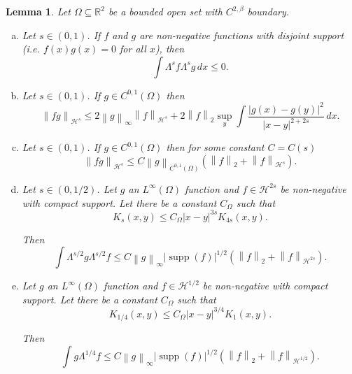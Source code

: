 \documentclass[11pt]{amsart}
\newtheorem{lemma}[theorem]{Lemma}
\theoremstyle{remark}
\theoremstyle{definition}
\newcommand{\R}{\mathbb{R}}
\newcommand{\norm}[1]{\left\lVert#1\right\rVert}
\newcommand{\paren}[1]{\left( #1 \right)}
\DeclareMathOperator{\supp}{supp}
\newcommand{\HD}{\mathcal{H}}
\newcommand{\Comega}{C_\Omega}
\begin{document}
\begin{lemma} \label{thm:Lambda stuff}
Let $\Omega \subseteq \R^2$ be a bounded open set with $C^{2,\beta}$ boundary.  

\begin{enumerate}[(a)]
\item \label{thm:disjoint} Let $s \in (0,1)$.  If $f$ and $g$ are non-negative functions with disjoint support (i.e. $f(x)g(x) = 0$ for all $x$), then 
\[ \int \Lambda^s f \Lambda^s g \,dx \leq 0. \]

\item \label{thm:product rule} Let $s \in (0,1)$.  If $g \in C^{0,1}(\Omega)$ then
\[ \norm{fg}_{\HD^s} \leq 2 \norm{g}_\infty \norm{f}_{\HD^s} + 2 \norm{f}_2 \sup_y \int \frac{|g(x)-g(y)|^2}{|x-y|^{2+2s}} \,dx. \]

\item \label{thm:extra product rule} Let $s \in (0,1)$.  If $g \in C^{0,1}(\Omega)$ then for some constant $C=C(s)$
\[  \norm{fg}_{\HD^s} \leq C \norm{g}_{C^{0,1}(\Omega)} \paren{\norm{f}_2 + \norm{f}_{\HD^s}}. \]

\item \label{thm:L1 of Lambda bounded} Let $s\in(0,1/2)$.  Let $g$ an $L^\infty(\Omega)$ function and $f \in \HD^{2s}$ be non-negative with compact support.  Let there be a constant $\Comega$ such that
\begin{equation} \label{K bounded between orders} K_s(x,y) \leq \Comega |x-y|^{3s} K_{4s}(x,y). \end{equation}

Then
\[ \int \Lambda^{s/2} g \Lambda^{s/2} f \leq C \norm{g}_\infty |\supp(f)|^{1/2} \paren{ \norm{f}_2 + \norm{f}_{\HD^{2s}}}. \]

\item \label{thm:L1 of Lambda1/4 bounded} Let $g$ an $L^\infty(\Omega)$ function and $f \in \HD^{1/2}$ be non-negative with compact support.  Let there be a constant $\Comega$ such that
\[ K_{1/4}(x,y) \leq \Comega |x-y|^{3/4} K_{1}(x,y). \]

Then
\[ \int g \Lambda^{1/4} f \leq C \norm{g}_\infty |\supp(f)|^{1/2} \paren{ \norm{f}_2 + \norm{f}_{\HD^{1/2}}}. \]

\end{enumerate}
\end{lemma}
\end{document}
